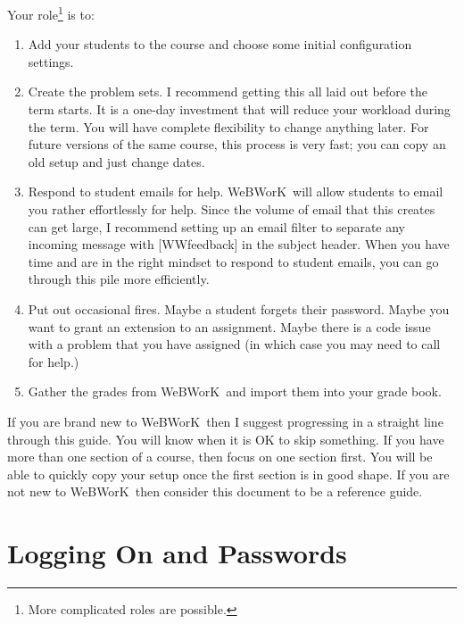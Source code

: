 \documentclass[12pt]{article}
\newcommand{\WW}{WeBWorK}
\begin{document}
Your role\footnote{More complicated roles are possible.
} is to:
\begin{enumerate}
	\item Add your students to the course and choose some initial configuration settings.
	\item Create the problem sets.
	      I recommend getting this all laid out before the term starts.
	      It is a one-day investment that will reduce your workload during the term.
	      You will have complete flexibility to change anything later.
	      For future versions of the same course, this process is very fast; you can copy an old setup and just change dates.
	\item Respond to student emails for help.
	      \WW\ will allow students to email you rather effortlessly for help.
	      Since the volume of email that this creates can get large, I recommend setting up an email filter to separate any incoming message with [WWfeedback] in the subject header.
	      When you have time and are in the right mindset to respond to student emails, you can go through this pile more efficiently.
	\item Put out occasional fires.
	      Maybe a student forgets their password.
	      Maybe you want to grant an extension to an assignment.
	      Maybe there is a code issue with a problem that you have assigned (in which case you may need to call for help.)
	\item Gather the grades from \WW\ and import them into your grade book.
\end{enumerate}

If you are brand new to \WW\, then I suggest progressing in a straight line through this guide.
You will know when it is OK to skip something.
If you have more than one section of a course, then focus on one section first.
You will be able to quickly copy your setup once the first section is in good shape.
If you are not new to \WW\, then consider this document to be a reference guide.

\section{Logging On and Passwords}
\end{document}
